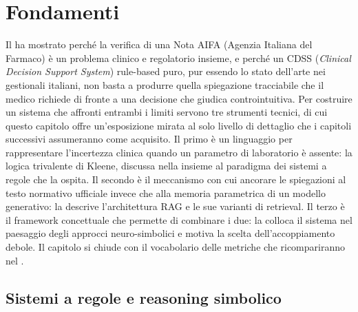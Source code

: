 
\chapter{Fondamenti}
\label{ch:background}

Il  ha mostrato perché la verifica di una Nota AIFA (Agenzia Italiana del Farmaco) è un
problema clinico e regolatorio insieme, e perché un CDSS (\emph{Clinical Decision Support System}) rule-based puro,
pur essendo lo stato dell'arte nei gestionali italiani, non basta a produrre
quella spiegazione tracciabile che il medico richiede di fronte a una decisione
che giudica controintuitiva. Per costruire un sistema che affronti entrambi i
limiti servono tre strumenti tecnici, di cui questo capitolo offre un'esposizione
mirata al solo livello di dettaglio che i capitoli successivi assumeranno come
acquisito. Il primo è un linguaggio per rappresentare l'incertezza clinica
quando un parametro di laboratorio è assente: la logica trivalente di Kleene,
discussa nella  insieme al paradigma dei sistemi a regole
che la ospita. Il secondo è il meccanismo con cui ancorare le spiegazioni al
testo normativo ufficiale invece che alla memoria parametrica di un modello
generativo: la  descrive l'architettura RAG e le sue varianti di
retrieval. Il terzo è il framework concettuale che permette di combinare i due:
la  colloca il sistema nel paesaggio degli approcci
neuro-simbolici e motiva la scelta dell'accoppiamento debole. Il capitolo si
chiude con il vocabolario delle metriche che ricompariranno nel
.


\section{Sistemi a regole e reasoning simbolico}
\label{sec:rule-based}


